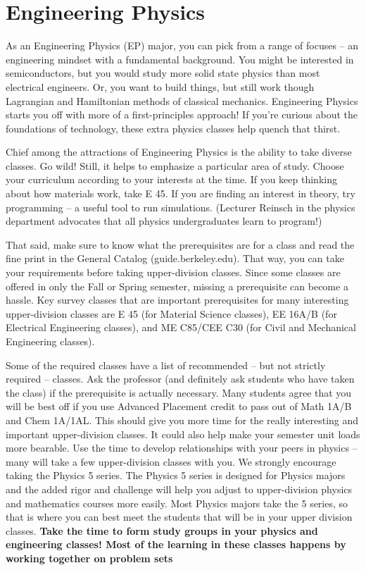 \chapter*{Engineering Physics}

As an Engineering Physics (EP) major, you can pick from a range of focuses – an engineering mindset with a fundamental background. You might be interested in semiconductors, but you would study more solid state physics than most electrical engineers. Or, you want to build things, but still work though Lagrangian and Hamiltonian methods of classical mechanics. Engineering Physics starts you off with more of a first-principles approach! If you’re curious about the foundations of technology, these extra physics classes help quench that thirst.

Chief among the attractions of Engineering Physics is the ability to take diverse classes. Go wild! Still, it helps to emphasize a particular area of study. Choose your curriculum according to your interests at the time. If you keep thinking about how materials work, take E 45. If you are finding an interest in theory, try programming – a useful tool to run simulations. (Lecturer Reinsch in the physics department advocates that all physics undergraduates learn to program!)

That said, make sure to know what the prerequisites are for a class and read the fine print in the General Catalog ({\selectfont guide.berkeley.edu}). That way, you can take your requirements before taking upper-division classes. Since some classes are offered in only the Fall or Spring semester, missing a prerequisite can become a hassle. Key survey classes that are important prerequisites for many interesting upper-division classes are E 45 (for Material Science classes), EE 16A/B (for Electrical Engineering classes), and ME C85/CEE C30 (for Civil and Mechanical Engineering classes).

Some of the required classes have a list of recommended – but not strictly required – classes. Ask the professor (and definitely ask students who have taken the class) if the prerequisite is actually necessary. Many students agree that you will be best off if you use Advanced Placement credit to pass out of Math 1A/B and Chem 1A/1AL. This should give you more time for the really interesting and important upper-division classes. It could also help make your semester unit loads more bearable. Use the time to develop relationships with your peers in physics – many will take a few upper-division classes with you. We strongly encourage taking the Physics 5 series. The Physics 5 series is designed for Physics majors and the added rigor and challenge will help you adjust to upper-division physics and mathematics courses more easily. Most Physics majors take the 5 series, so that is where you can best meet the students that will be in your upper division classes. \textbf{Take the time to form study groups in your physics and engineering classes! Most of the learning in these classes happens by working together on problem sets}

